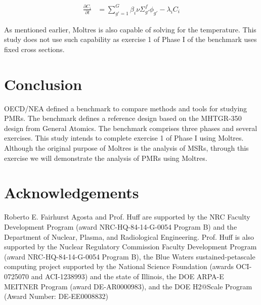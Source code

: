 \documentclass{anstrans}
\begin{document}
\begin{align}
        \frac{\partial C_i}{\partial t} &= \sum_{g'= 1}^G \beta_i \nu
        \Sigma_{g'}^f \phi_{g'} - \lambda_i C_i
\label{eq:precursors}
\end{align}

As mentioned earlier, Moltres is also capable of solving for the temperature.
This study does not use such capability as exercise 1 of Phase I of the benchmark uses fixed cross sections.

\section{Conclusion}

OECD/NEA defined a benchmark to compare methods and tools for studying \glspl{PMR}.
The benchmark defines a reference design based on the MHTGR-350 design from General Atomics.
The benchmark comprises three phases and several exercises.
This study intends to complete exercise 1 of Phase I using Moltres.
Although the original purpose of Moltres is the analysis of \glspl{MSR}, through this exercise we will demonstrate the analysis of \glspl{PMR} using Moltres.

\section{Acknowledgements}

Roberto E. Fairhurst Agosta and Prof. Huff are supported by the \gls{NRC} Faculty Development Program (award NRC-HQ-84-14-G-0054 Program B) and the Department of Nuclear, Plasma, and Radiological Engineering.
Prof. Huff is also supported by the Nuclear Regulatory Commission Faculty Development Program (award NRC-HQ-84-14-G-0054 Program B), the Blue Waters sustained-petascale computing project supported by the National Science Foundation (awards OCI-0725070 and ACI-1238993) and the state of Illinois, the DOE ARPA-E MEITNER Program (award DE-AR0000983), and the DOE H2@Scale Program (Award Number: DE-EE0008832)



\end{document}

